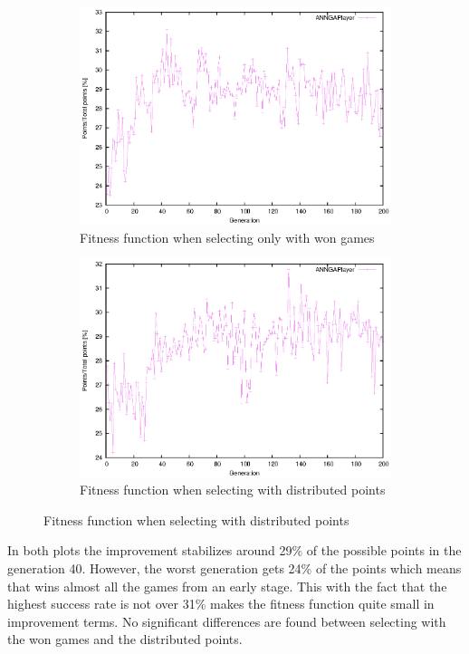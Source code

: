 			\begin{figure}[!ht]
				\centering
				\begin{subfigure}{.5\textwidth}
				  \centering
				  \includegraphics[width=\textwidth]{figures/fitness_won}
				  \caption{Fitness function when selecting only with won games}
				  \label{fig:fitness_won}
				\end{subfigure}%
				\begin{subfigure}{.5\textwidth}
				  \centering
				  \includegraphics[width=\textwidth]{figures/fitness_distributed_points}
				  \caption{Fitness function when selecting with distributed points}
				  \label{fig:fitness_distributed_points}
				\end{subfigure}
			\end{figure}
		In both plots the improvement stabilizes around 29\% of the possible points in the generation 40.
		However, the worst generation gets 24\% of the points which means that wins almost all the games from an early stage.
		This with the fact that the highest success rate is not over 31\% makes the fitness function quite small in improvement terms.
		No significant differences are found between selecting with the won games and the distributed points.

